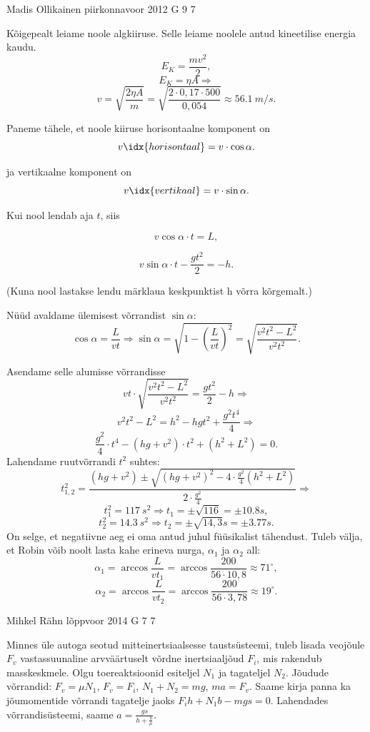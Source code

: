 \documentclass[11pt, twoside]{article}
\begin{document}
{%
{Madis Ollikainen} %
{piirkonnavoor} %
{2012} %
{G 9} %
{7} %
{

\ifSolution
Kõigepealt leiame noole algkiiruse. Selle leiame noolele antud kineetilise energia kaudu.
$$ E_{K}=\frac{m v^2}{2},$$
$$E_{K}=\eta A \Rightarrow$$
$$v=\sqrt{\frac{2\eta A}{m}}=\sqrt{\frac{2\cdot0,17\cdot 500}{0,054}}\approx \SI{56,1}{m/s}.$$

Paneme tähele, et noole kiiruse horisontaalne komponent on
$$v\idx{horisontaal}=v\cdot \cos\alpha.$$

ja vertikaalne komponent on
$$v\idx{vertikaal}=v\cdot \sin\alpha.$$

Kui nool lendab aja $t$, siis 

$$v \cos\alpha\cdot t=L,$$

$$v \sin\alpha\cdot t-\frac{g t^2}{2}=-h. $$

(Kuna nool lastakse lendu märklaua keskpunktist h võrra kõrgemalt.)

Nüüd avaldame ülemisest võrrandist $\sin\alpha$:
$$\cos\alpha=\frac{L}{vt} \Rightarrow \sin\alpha=\sqrt{1-\left(\frac{L}{vt}\right)^2}=\sqrt{\frac{v^2t^2-L^2}{v^2t^2}}.$$


Asendame selle alumisse võrrandisse
$$vt\cdot \sqrt{\frac{v^2t^2-L^2}{v^2t^2}}=\frac{g t^2}{2}-h \Rightarrow$$
$$v^2t^2-L^2=h^2 - hgt^2+\frac{g^2 t^4}{4}  \Rightarrow$$
$$\frac{g^2}{4}\cdot t^4 - \left(hg+v^2\right)\cdot t^2 + \left(h^2+L^2\right)=0.$$
Lahendame ruutvõrrandi $t^2$ suhtes:
$$t^2_{1,2}=\frac{\left(hg+v^2\right)\pm\sqrt{\left(hg+v^2\right)^2-4\cdot \frac{g^2}{4}\left(h^2+L^2\right)}}{2\cdot \frac{g^2}{4}} \Rightarrow$$
$$t^2_{1}=\SI{117}{s^2}  \Rightarrow t_{1}=\pm\sqrt{116}=\pm \SI{10,8}s,$$
$$t^2_{2}=\SI{14,3}{s^2} \Rightarrow t_{2}=\pm \sqrt{14,3}\SI{}s=\pm \SI{3,77}s.$$
On selge, et negatiivne aeg ei oma antud juhul füüsikalist tähendust. Tuleb välja, et Robin võib noolt lasta kahe erineva nurga, 
$\alpha_{1}$ ja $\alpha_{2}$ all:
$$\alpha_{1}= \arccos\frac{L}{vt_{1}}=\arccos\frac{200}{56\cdot10,8}\approx 71^\circ ,$$
$$\alpha_{2}=\arccos\frac{L}{vt_{2}}=\arccos\frac{200}{56\cdot3,78}\approx 19^\circ .$$
\fi
}

{Mihkel Rähn} %
{lõppvoor} %
{2014} %
{G 7} %
{7} %
{

\ifSolution
Minnes üle autoga seotud mitteinertsiaalsesse taustsüsteemi, tuleb lisada veojõule $F_v$ vastassuunaline arvväärtuselt võrdne inertsiaaljõud $F_i$, mis rakendub masskeskmele. Olgu toereaktsioonid esiteljel $N_1$ ja tagateljel $N_2$. Jõudude võrrandid: $F_v=\mu N_1$, $F_v=F_i$, $N_1+N_2=mg$, $ma=F_v$. Saame kirja panna ka jõumomentide võrrandi tagatelje jaoks $F_ih+N_1b-mgs=0$.
Lahendades võrrandisüsteemi, saame $a=\frac{gs}{h+\frac{b}{\mu}}$.
\fi
}

}
\end{document}
